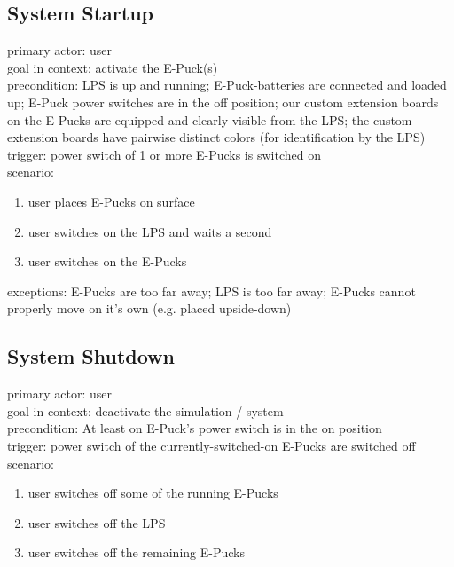 \documentclass[a4paper,parskip,headheight=38pt]{scrartcl} %
\begin{document}
\subsection{System Startup}
primary actor: user \\
goal in context: activate the E-Puck(s) \\
precondition: LPS is up and running; E-Puck-batteries are connected and loaded up;
  E-Puck power switches are in the off position; our custom extension boards on the E-Pucks
  are equipped and clearly visible from the LPS; the custom extension boards have
  pairwise distinct colors (for identification by the LPS) \\
trigger: power switch of 1 or more E-Pucks is switched on \\
scenario:
\begin{enumerate}[label={\arabic*.}]
	\item user places E-Pucks on surface
	\item user switches on the LPS and waits a second
	\item user switches on the E-Pucks
\end{enumerate}
exceptions: E-Pucks are too far away; LPS is too far away; E-Pucks cannot properly move on it's own (e.g. placed upside-down)

\subsection{System Shutdown}
primary actor: user \\
goal in context: deactivate the simulation / system \\
precondition: At least on E-Puck's power switch is in the on position \\
trigger: power switch of the currently-switched-on E-Pucks are switched off \\
scenario:
\begin{enumerate}[label={\arabic*.}]
	\item user switches off some of the running E-Pucks
	\item user switches off the LPS
	\item user switches off the remaining E-Pucks
\end{enumerate}
\end{document}
